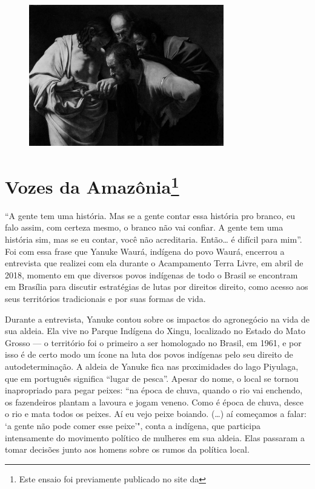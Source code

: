\begin{figure}[!ht]
\centering
 \includegraphics[width=85mm]{./imgs/crer.png}
\caption{\tiny{}}
\end{figure}

\chapter*{Vozes da Amazônia\footnote[*]{Este ensaio foi %
  previamente publicado no site da {}}}

``A gente tem uma história. Mas se a gente contar essa história pro
branco, eu falo assim, com certeza mesmo, o branco não vai confiar. A
gente tem uma história sim, mas se eu contar, você não acreditaria.
Então\ldots{} é difícil para mim''. Foi com essa frase que Yanuke Waurá,
indígena do povo Waurá, encerrou a entrevista que realizei com ela
durante o Acampamento Terra Livre, em abril de 2018, momento em que
diversos povos indígenas de todo o Brasil se encontram em Brasília para
discutir estratégias de lutas por direitos direito, como acesso aos seus
territórios tradicionais e por suas formas de vida.

Durante a entrevista, Yanuke contou sobre os impactos do agronegócio na
vida de sua aldeia. Ela vive no Parque Indígena do Xingu, localizado
no Estado do Mato Grosso --- o território foi o primeiro a ser homologado
no Brasil, em 1961, e por isso é de certo modo um ícone na luta dos
povos indígenas pelo seu direito de autodeterminação. A aldeia de Yanuke
fica nas proximidades do lago Piyulaga, que em português significa
``lugar de pesca''. Apesar do nome, o local se tornou inapropriado para
pegar peixes: ``na época de chuva, quando o rio vai enchendo, os
fazendeiros plantam a lavoura e jogam veneno. Como é época de chuva,
desce o rio e mata todos os peixes. Aí eu vejo peixe boiando. (\ldots{}) aí
começamos a falar: `a gente não pode comer esse peixe'", conta a
indígena, que participa intensamente do movimento político de mulheres
em sua aldeia. Elas passaram a tomar decisões junto aos homens sobre os
rumos da política local.

